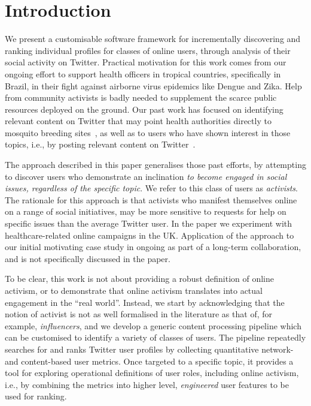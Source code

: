 \section{Introduction}

We present a customisable software framework for incrementally discovering and ranking individual profiles for classes of online users, through analysis of their social activity on Twitter.
Practical motivation for this work comes from our ongoing effort to support health officers in tropical countries, specifically in Brazil, in their fight against airborne virus epidemics like Dengue and Zika. Help from community activists is badly needed to supplement the scarce public resources deployed on the ground. Our past work has focused on identifying relevant content on Twitter that may point health authorities directly to mosquito breeding sites~\cite{Sousa2018}, as well as to users who have shown interest in those topics, i.e., by posting relevant content on Twitter~\cite{Missier2017}. 

The approach described in this paper generalises those past efforts, by attempting to discover users who demonstrate an inclination \textit{to become engaged in social issues, regardless of the specific topic}.
We refer to this class of users as \textit{activists}.
The rationale for this approach is that activists who manifest themselves online on a range of social initiatives, may be more sensitive to requests for help on specific issues than the average Twitter user.
In the paper we experiment with healthcare-related online campaigns in the UK. Application of the approach to our initial motivating case study in ongoing as part of a long-term collaboration, and is not specifically discussed in the paper.

To be clear, this work is not about providing a robust definition of online activism, or to demonstrate that online activism translates into actual engagement in the ``real world''.
%
Instead, we start by acknowledging that the notion of activist is not as well formalised in the literature as that of, for example, \textit{influencers}, and we develop a generic content processing pipeline which can be customised to identify a variety of classes of users. 
The pipeline repeatedly searches for and ranks Twitter user profiles by collecting quantitative network- and content-based user metrics. 
Once targeted to a specific topic, it provides a tool for exploring operational definitions of user roles, including online activism, i.e., by combining the metrics into higher level, \textit{engineered} user features to be used for ranking.

